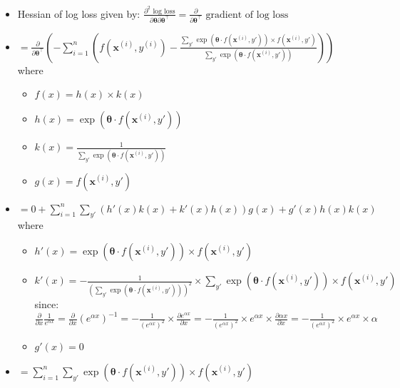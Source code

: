 \begin{itemize}
    \item Hessian of log loss given by:
    $
    \frac{\partial^2 \textrm{ log loss}}{\partial \boldsymbol{\theta} \partial \boldsymbol{\theta}^\intercal} = \frac{\partial}{\partial \boldsymbol{\theta}^\intercal} \textrm{ gradient of log loss}
    $
    \item $
    = \frac{\partial}{\partial \boldsymbol{\theta}^\intercal} \left( - \sum_{i=1}^n \left( f(\boldsymbol{x}^{(i)}, y^{(i)}) - \frac{\sum_{y'} \exp(\boldsymbol{\theta} \cdot f(\boldsymbol{x}^{(i)}, y')) \times f(\boldsymbol{x}^{(i)}, y')}{\sum_{y'} \exp(\boldsymbol{\theta} \cdot f(\boldsymbol{x}^{(i)}, y'))} \right) \right)
    $ where
    \begin{itemize}
        \item $f(x) = h(x) \times k(x)$
        \item $h(x) = \exp(\boldsymbol{\theta} \cdot f(\boldsymbol{x}^{(i)}, y'))$
        \item $k(x) = \frac{1}{\sum_{y'} \exp(\boldsymbol{\theta} \cdot f(\boldsymbol{x}^{(i)}, y'))}$
        \item $g(x) = f(\boldsymbol{x}^{(i)}, y')$
    \end{itemize}
    \item $ = 0 + \sum_{i=1}^n \sum_{y'} \left( h'(x)k(x) + k'(x)h(x) \right) g(x) + g'(x)h(x)k(x)$ where
    \begin{itemize}
        \item $h'(x) = \exp(\boldsymbol{\theta} \cdot f(\boldsymbol{x}^{(i)}, y')) \times f(\boldsymbol{x}^{(i)}, y')$
        \item $k'(x) = -\frac{1}{(\sum_{y'} \exp(\boldsymbol{\theta} \cdot f(\boldsymbol{x}^{(i)}, y')))^2} \times \sum_{y'} \exp(\boldsymbol{\theta} \cdot f(\boldsymbol{x}^{(i)}, y')) \times f(\boldsymbol{x}^{(i)}, y')$\\
        since: $\frac{\partial}{\partial x} \frac{1}{e^{\alpha x}} = \frac{\partial}{\partial x} (e^{\alpha x})^{-1} = -\frac{1}{(e^{\alpha x})^2} \times \frac{\partial e^{\alpha x}}{\partial x} = -\frac{1}{(e^{\alpha x})^2} \times e^{\alpha x} \times \frac{\partial \alpha x}{\partial x} = -\frac{1}{(e^{\alpha x})^2} \times e^{\alpha x} \times \alpha$
        \item $g'(x) = 0$
    \end{itemize}
    \item $ = \sum_{i=1}^n \sum_{y'} \exp(\boldsymbol{\theta} \cdot f(\boldsymbol{x}^{(i)}, y')) \times f(\boldsymbol{x}^{(i)}, y')$ 

\end{itemize}

